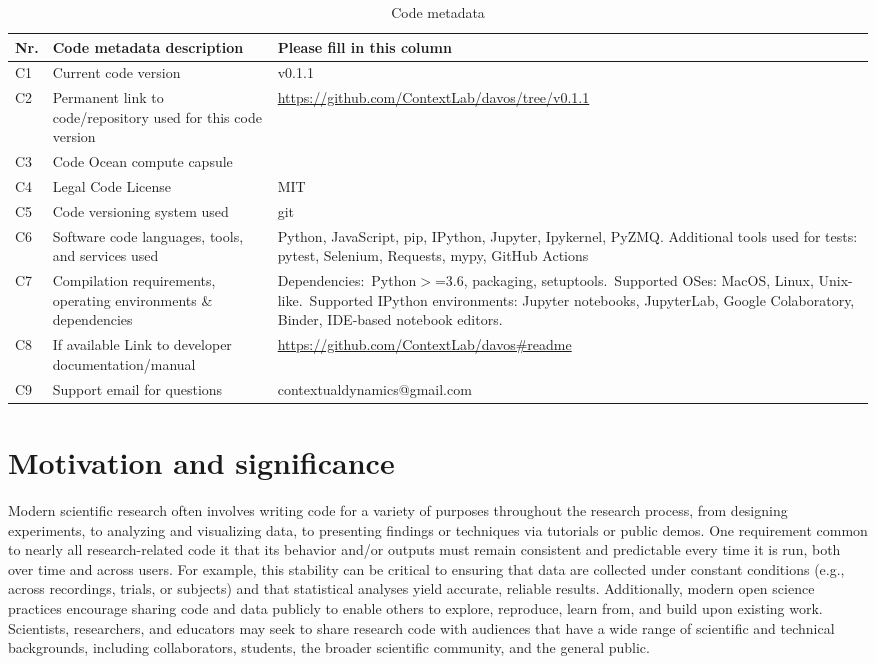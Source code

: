 \documentclass[preprint,12pt, a4paper]{elsarticle}
\begin{document}
\begin{table}[H]
\begin{tabular}{|l|p{6.5cm}|p{6.5cm}|}
\hline
\textbf{Nr.} & \textbf{Code metadata description} & \textbf{Please fill in this column} \\
\hline
C1 & Current code version &  v0.1.1 \\
\hline
C2 & Permanent link to code/repository used for this code version & \url{https://github.com/ContextLab/davos/tree/v0.1.1} \\
\hline
C3 & Code Ocean compute capsule & \\
\hline
C4 & Legal Code License & MIT \\
\hline
C5 & Code versioning system used & git \\
\hline
C6 & Software code languages, tools, and services used & Python, JavaScript, pip, IPython, Jupyter, Ipykernel, PyZMQ. Additional tools used for tests: pytest, Selenium, Requests, mypy, GitHub Actions \\
\hline
C7 & Compilation requirements, operating environments \& dependencies & Dependencies:~Python$>$=3.6, packaging, setuptools.~Supported OSes: MacOS, Linux, Unix-like.~Supported IPython environments: Jupyter notebooks, JupyterLab, Google Colaboratory, Binder, IDE-based notebook editors. \\
\hline
C8 & If available Link to developer documentation/manual & \url{https://github.com/ContextLab/davos\#readme} \\
\hline
C9 & Support email for questions & contextualdynamics@gmail.com \\
\hline
\end{tabular}
\caption{Code metadata}
\label{}
\end{table}

\linenumbers


\section{Motivation and significance}
Modern scientific research often involves writing code for a variety of purposes throughout the research process, from designing experiments, to analyzing and visualizing data, to presenting findings or techniques via tutorials or public demos. 
One requirement common to nearly all research-related code it that its behavior and/or outputs must remain consistent and predictable every time it is run, both over time and across users. 
For example, this stability can be critical to ensuring that data are collected under constant conditions (e.g., across recordings, trials, or subjects) and that statistical analyses yield accurate, reliable results. 
Additionally, modern open science practices encourage sharing code and data publicly to enable others to explore, reproduce, learn from, and build upon existing work. 
Scientists, researchers, and educators may seek to share research code with audiences that have a wide range of scientific and technical backgrounds, including collaborators, students, the broader scientific community, and the general public.
\end{document}
